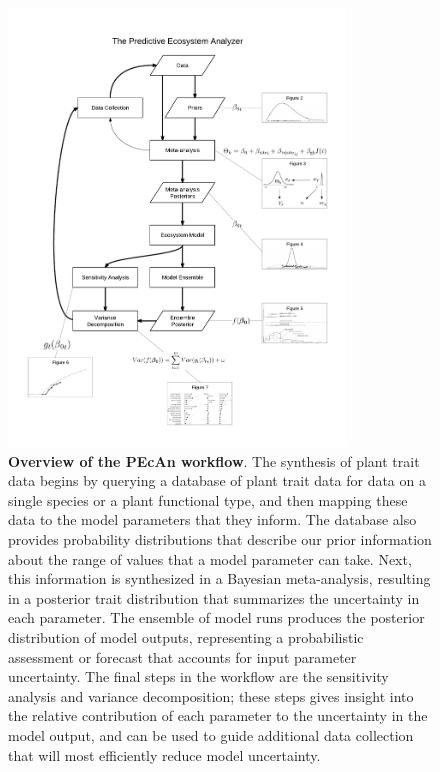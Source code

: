 \documentclass[12pt]{article}
\begin{document}
\begin{flushleft}
\begin{spacing}{1.9}
\clearpage
\newpage
\listoffigures
\begin{figure}[p] 
 \caption%
 {{\bf Overview of the PEcAn workflow}.
  The synthesis of plant trait data begins by querying a database of plant trait data for data on a single species or a plant functional type, and then mapping these data to the model parameters that they inform.
  The database also provides probability distributions that describe our prior information about the range of values that a model parameter can take.
  Next, this information is synthesized in a Bayesian meta-analysis, resulting in a posterior trait distribution that summarizes the uncertainty in each parameter.
  The ensemble of model runs produces the posterior distribution of model outputs,  representing a probabilistic assessment or forecast that accounts for input parameter uncertainty.
  The final steps in the workflow are the sensitivity analysis and variance decomposition; these steps gives insight into the relative contribution of each parameter to the uncertainty in the model output, and can be used to guide additional data collection that will most efficiently reduce model uncertainty. }
\begin{center}
\includegraphics[width=0.8\textwidth]{workflow.pdf}
\end{center}
\label{fig:workflow}
\end{figure}




\end{spacing}
\end{flushleft}
\end{document}
